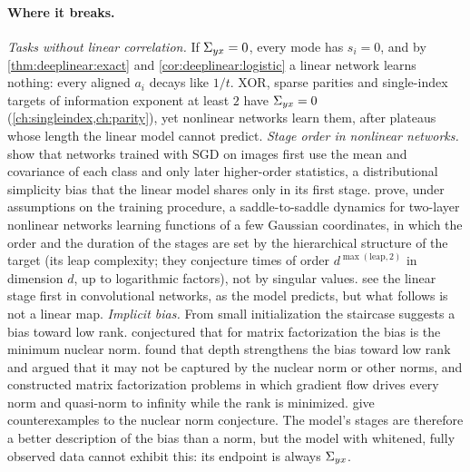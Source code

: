 \begin{refsection}
\paragraph{Where it breaks.} \emph{Tasks without linear correlation.} If $\Sigma_{yx}=0$, every mode has $s_i=0$, and by \cref{thm:deeplinear:exact} and \cref{cor:deeplinear:logistic} a linear network learns nothing: every aligned $a_i$ decays like $1/t$. XOR, sparse parities and single-index targets of information exponent at least $2$ have $\Sigma_{yx}=0$ (\cref{ch:singleindex,ch:parity}), yet nonlinear networks learn them, after plateaus whose length the linear model cannot predict. \emph{Stage order in nonlinear networks.} \Textcite{RefinettiEtAl2023} show that networks trained with SGD on images first use the mean and covariance of each class and only later higher-order statistics, a distributional simplicity bias that the linear model shares only in its first stage. \Textcite{AbbeEtAl2023} prove, under assumptions on the training procedure, a saddle-to-saddle dynamics for two-layer nonlinear networks learning functions of a few Gaussian coordinates, in which the order and the duration of the stages are set by the hierarchical structure of the target (its leap complexity; they conjecture times of order $d^{\max(\text{leap},2)}$ in dimension $d$, up to logarithmic factors), not by singular values. \Textcite{KalimerisEtAl2019} see the linear stage first in convolutional networks, as the model predicts, but what follows is not a linear map. \emph{Implicit bias.} From small initialization the staircase suggests a bias toward low rank. \Textcite{GunasekarEtAl2017} conjectured that for matrix factorization the bias is the minimum nuclear norm. \Textcite{AroraEtAl2019} found that depth strengthens the bias toward low rank and argued that it may not be captured by the nuclear norm or other norms, and \textcite{RazinCohen2020} constructed matrix factorization problems in which gradient flow drives every norm and quasi-norm to infinity while the rank is minimized. \Textcite{LiLuoLyu2021} give counterexamples to the nuclear norm conjecture. The model's stages are therefore a better description of the bias than a norm, but the model with whitened, fully observed data cannot exhibit this: its endpoint is always $\Sigma_{yx}$.


\end{refsection}
